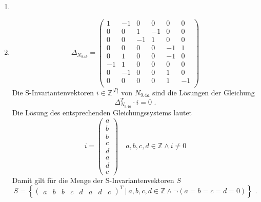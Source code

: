 \documentclass[a4paper]{scrartcl}
\begin{document}
\begin{enumerate}
    \item

    \item
        \begin{equation}
            \Delta_{N_{9.4b}} =
            \begin{pmatrix}
                 1 & -1 &  0 &  0 &  0 &  0 \\
                 0 &  0 &  1 & -1 &  0 &  0 \\
                 0 &  0 & -1 &  1 &  0 &  0 \\
                 0 &  0 &  0 &  0 & -1 &  1 \\
                 0 &  1 &  0 &  0 & -1 &  0 \\
                -1 &  1 &  0 &  0 &  0 &  0 \\
                 0 & -1 &  0 &  0 &  1 &  0 \\
                 0 &  0 &  0 &  0 &  1 & -1 \\
            \end{pmatrix}
        \end{equation}
        Die S-Invariantenvektoren $i \in \mathbb{Z}^{|P|}$ von $N_{9.4a}$ sind
        die Lösungen der Gleichung
        \begin{equation}
            \Delta_{N_{9.4a}}^T \cdot i = 0 \text{ .}
        \end{equation}
        Die Lösung des entsprechenden Gleichungssystems lautet
        \begin{equation}
            i =
            \begin{pmatrix}
                a \\ b \\ b \\ c \\ d \\ a \\ d \\ c
            \end{pmatrix}
            \quad
            a, b, c, d \in \mathbb{Z} \land i \neq 0
        \end{equation}
        Damit gilt für die Menge der S-Invariantenvektoren $S$
        \begin{equation}
            S = \left\{ 
                \begin{pmatrix}
                    a & b & b & c & d & a & d & c
                \end{pmatrix}^T
                \ \vert \ 
                a, b, c, d \in \mathbb{Z}
                \land
                \lnot \left( a = b = c = d = 0 \right)
            \right\}
            \text{ .}
        \end{equation}


\end{enumerate}
\end{document}
